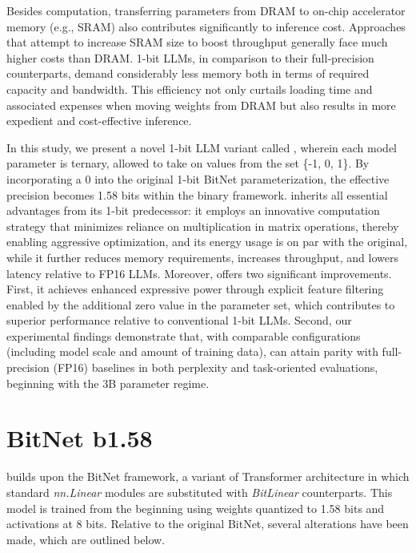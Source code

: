 Besides computation, transferring parameters from DRAM to on-chip accelerator memory (e.g., SRAM) also contributes significantly to inference cost. Approaches that attempt to increase SRAM size to boost throughput generally face much higher costs than DRAM. 1-bit LLMs, in comparison to their full-precision counterparts, demand considerably less memory both in terms of required capacity and bandwidth. This efficiency not only curtails loading time and associated expenses when moving weights from DRAM but also results in more expedient and cost-effective inference.

In this study, we present a novel 1-bit LLM variant called \textbf{}, wherein each model parameter is ternary, allowed to take on values from the set \{-1, 0, 1\}. By incorporating a 0 into the original 1-bit BitNet parameterization, the effective precision becomes 1.58 bits within the binary framework.  inherits all essential advantages from its 1-bit predecessor: it employs an innovative computation strategy that minimizes reliance on multiplication in matrix operations, thereby enabling aggressive optimization, and its energy usage is on par with the original, while it further reduces memory requirements, increases throughput, and lowers latency relative to FP16 LLMs. Moreover,  offers two significant improvements. First, it achieves enhanced expressive power through explicit feature filtering enabled by the additional zero value in the parameter set, which contributes to superior performance relative to conventional 1-bit LLMs. Second, our experimental findings demonstrate that, with comparable configurations (including model scale and amount of training data),  can attain parity with full-precision (FP16) baselines in both perplexity and task-oriented evaluations, beginning with the 3B parameter regime.

\section{BitNet b1.58}

 builds upon the BitNet framework, a variant of Transformer architecture in which standard \emph{nn.Linear} modules are substituted with \emph{BitLinear} counterparts. This model is trained from the beginning using weights quantized to 1.58 bits and activations at 8 bits. Relative to the original BitNet, several alterations have been made, which are outlined below.

